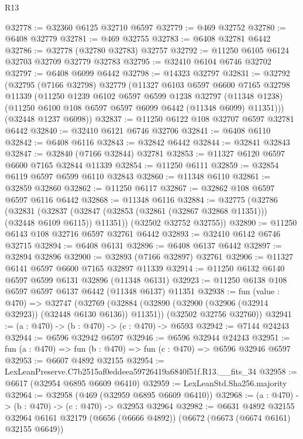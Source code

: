 \begin{lexlean}{R13}
\begin{coremodule}
@32778 := @32360 @6125 @32710 @6597
@32779 := @469 @32752
@32780 := @6408 @32779
@32781 := @469 @32755
@32783 := @6408 @32781 @6442
@32786 := @32778 (@32780 @32783) @32757
@32792 := @11250 @6105 @6124 @32703 @32709 @32779 @32783
@32795 := @32410 @6104 @6746 @32702
@32797 := @6408 @6099 @6442
@32798 := @14323 @32797
@32831 := @32792
    (@32795
      (@7166 @32798)
      @32779
      (@11327
        @6103
        @6597
        @6600
        @7165
        @32798
        @11339
        (@11250
          @1239
          @6102
          @6597
          @6599
          @1238
          @32797
          (@11348 @1238)
          (@11250 @6100 @108 @6597 @6597 @6099 @6442 (@11348 @6099) @11351)))
      (@32448 @1237 @6098))
@32837 := @11250 @6122 @108 @32707 @6597 @32781 @6442
@32840 := @32410 @6121 @6746 @32706
@32841 := @6408 @6110
@32842 := @6408 @6116
@32843 := @32842 @6442
@32844 := @32841 @32843
@32847 := @32840 (@7166 @32844) @32781
@32853 := @11327 @6120 @6597 @6600 @7165 @32844 @11339
@32854 := @11250 @6111
@32859 := @32854 @6119 @6597 @6599 @6110 @32843
@32860 := @11348 @6110
@32861 := @32859 @32860
@32862 := @11250 @6117
@32867 := @32862 @108 @6597 @6597 @6116 @6442
@32868 := @11348 @6116
@32884 := @32775
    (@32786
      (@32831
        (@32837 (@32847 (@32853 (@32861 (@32867 @32868 @11351))) (@32448 @6109 @6115)) @11351))
      (@32502 @32752 @32755))
@32890 := @11250 @6143 @108 @32716 @6597 @32761 @6442
@32893 := @32410 @6142 @6746 @32715
@32894 := @6408 @6131
@32896 := @6408 @6137 @6442
@32897 := @32894 @32896
@32900 := @32893 (@7166 @32897) @32761
@32906 := @11327 @6141 @6597 @6600 @7165 @32897 @11339
@32914 := @11250 @6132 @6140 @6597 @6599 @6131 @32896 (@11348 @6131)
@32923 := @11250 @6138 @108 @6597 @6597 @6137 @6442 (@11348 @6137) @11351
@32938 := fun (value : @470) =>
  @32747
    (@32769
      (@32884 (@32890 (@32900 (@32906 (@32914 @32923)) (@32448 @6130 @6136)) @11351))
      (@32502 @32756 @32760))
@32941 := (a : @470) -> (b : @470) -> (c : @470) -> @6593
@32942 := @7144 @24243
@32944 := @6596 @32942 @6597
@32946 := @6596 @32944 @24243
@32951 := fun (a : @470) => fun (b : @470) => fun (c : @470) => @6596 @32946 @6597
@32953 := @6607 @4892 @32155
@32954 := LexLeanPreserve.C7b2515af0eddeea59726419a6840f51f.R13.__fits_34
@32958 := @6617 (@32954 @6895 @6609 @6410)
@32959 := LexLeanStd.Sha256.majority
@32964 := @32958 (@469 (@32959 @6895 @6609 @6410))
@32968 := (a : @470) -> (b : @470) -> (c : @470) -> @32953 @32964
@32982 := @6631
    @4892
    @32155
    @32964
    @6161
    @32179
    (@6656 (@6666 @4892))
    (@6672 (@6673 (@6674 @6161) @32155 @6649))

\end{coremodule}
\end{lexlean}
